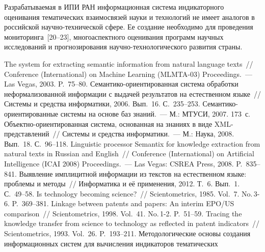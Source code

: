 \begin{multicols}{2}
  Разрабатываемая в ИПИ РАН информационная система индикаторного оценивания 
тематических взаимосвязей науки и технологий не имеет аналогов в российской 
  на\-уч\-но-тех\-ни\-че\-ской сфере. Ее создание необходимо для проведения мониторинга~[20--23], 
многоаспектного оценивания программ научных исследований и прогнозирования 
  на\-уч\-но-тех\-но\-ло\-ги\-че\-ско\-го развития страны.
     
{\small\frenchspacing
{%
\begin{thebibliography}{99}

 The system for extracting semantic information from natural 
language texts~// Conference (International) on Machine Learning (MLMTA-03) Proceedings.~--- 
Las Vegas, 2003. P.~75--80.
 Семантико-ориентированная система обработки неформализованной 
информации с выдачей результатов на естественном языке~// Сис\-те\-мы и средства 
информатики, 2006. Вып.~16. С.~235--253.
 Се\-ман\-ти\-ко-ориен\-ти\-ро\-ван\-ные сис\-те\-мы на 
основе баз знаний.~--- М.: \mbox{МТУСИ}, 2007. 173~с.
 Объект\-но-ори\-ен\-ти\-ро\-ван\-ная сис\-те\-ма, основанная на знаниях 
в виде XML-пред\-став\-ле\-ний~// Сис\-те\-мы и средства информатики.~--- М.: Наука, 2008. 
Вып.~18. С.~96--118.
 Linguistic processor Semantix for knowledge extraction 
from natural texts in Russian and English~// Conference (International) on Artificial Intelligence 
(ICAI 2008) Proceedings.~--- Las Vegas: CSREA Press, 2008. P.~835--841.
 Выявление имплицитной информации из текстов на 
естественном языке: проблемы и методы~// Информатика и её применения, 2012. Т.~6. 
Вып.~1. С.~49--58.
 Is technology becoming science?~// Scientometrics, 1985. Vol.~7. 
No.\,3-6. P.~369--381.
 Linkage between patents and papers: An interim EPO/US 
comparison~// Scientometrics, 1998. Vol.~41. No.\,1-2. P.~51--59.
 Tracing the knowledge transfer from science to technology as reflected in patent 
indicators~// Scientometrics, 1993. Vol.~26. P.~193--211.
 Методологические основы 
создания информационных сис\-тем для вы\-чис\-ле\-ния индикаторов тематических 

\end{thebibliography}}}
\end{multicols}
